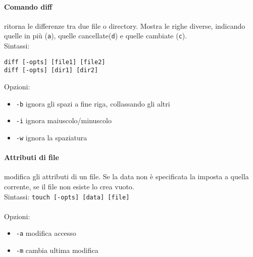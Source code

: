 \documentclass[a4paper]{article}
\begin{document}
\paragraph{Comando diff} ritorna le differenze tra due file o directory. Mostra le righe diverse, indicando quelle in più (\verb|a|), quelle cancellate(\verb|d|) e quelle cambiate (\verb|c|).\\
Sintassi:
\begin{verbatim}
diff [-opts] [file1] [file2]
diff [-opts] [dir1] [dir2]
\end{verbatim}
Opzioni:
\begin{itemize}
\item \verb|-b| ignora gli spazi a fine riga, collassando gli altri
\item \verb|-i| ignora maiuscolo/minuscolo
\item \verb|-w| ignora la spaziatura
\end{itemize}

\paragraph{Attributi di file} modifica gli attributi di un file. Se la data non è specificata la imposta a quella corrente, se il file non esiste lo crea vuoto. \\
Sintassi:
\verb|touch [-opts] [data] [file]| \\ \\
Opzioni:
\begin{itemize}
\item \verb|-a| modifica accesso
\item \verb|-m| cambia ultima modifica
\end{itemize}
\end{document}
